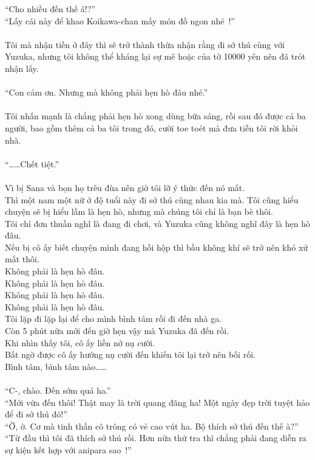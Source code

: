 \documentclass[12pt,a4paper, twosides]{book}
\begin{document}
“Cho nhiều đến thế á!?”\\
“Lấy cái này để khao Koikawa-chan mấy món đồ ngon nhé~!”\\
\\
Tôi mà nhận tiền ở đây thì sẽ trở thành thừa nhận rằng đi sở thú cùng với Yuzuka, nhưng tôi không thể kháng lại sự mê hoặc của tờ 10000 yên nên đã trót nhận lấy.\\
\\
“Con cảm ơn. Nhưng mà không phải hẹn hò đâu nhé.”\\
\\
Tôi nhấn mạnh là chẳng phải hẹn hò xong dùng bữa sáng, rồi sau đó được cả ba người, bao gồm thêm cả ba tôi trong đó, cười toe toét mà đưa tiễn tôi rời khỏi nhà.\\
\\
“……Chết tiệt.”\\
\\
Vì bị Sana và bọn họ trêu đùa nên giờ tôi lỡ ý thức đến nó mất.\\
Thì một nam một nữ ở độ tuổi này đi sở thú cùng nhau kia mà. Tôi cũng hiểu chuyện sẽ bị hiểu lầm là hẹn hò, nhưng mà chúng tôi chỉ là bạn bè thôi.\\
Tôi chỉ đơn thuần nghĩ là đang đi chơi, và Yuzuka cũng không nghĩ đây là hẹn hò đâu.\\
Nếu bị cô ấy biết chuyện mình đang hồi hộp thì bầu không khí sẽ trở nên khó xử mất thôi.\\
Không phải là hẹn hò đâu.\\
Không phải là hẹn hò đâu.\\
Không phải là hẹn hò đâu.\\
Không phải là hẹn hò đâu.\\
Tôi lặp đi lặp lại để cho mình bình tâm rồi đi đến nhà ga.\\
Còn 5 phút nữa mới đến giờ hẹn vậy mà Yuzuka đã đến rồi.\\
Khi nhìn thấy tôi, cô ấy liền nở nụ cười.\\
Bất ngờ được cô ấy hướng nụ cười đến khiến tôi lại trở nên bối rối.\\
Bình tâm, bình tâm nào……\\
\\
“C-, chào. Đến sớm quá ha.”\\
“Mới vừa đến thôi! Thật may là trời quang đãng ha! Một ngày đẹp trời tuyệt hảo để đi sở thú đó!”\\
“Ờ, ờ. Cơ mà tinh thần cô trông có vẻ cao vút ha. Bộ thích sở thú đến thế à?”\\
“Từ đầu thì tôi đã thích sở thú rồi. Hơn nữa thử tra thì chẳng phải đang diễn ra sự kiện kết hợp với anipara sao~!”\\
\end{document}
